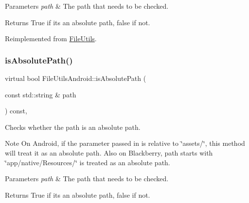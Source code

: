 \begin{DoxyParams}{Parameters}
{\em path} & The path that needs to be checked. \\
\hline
\end{DoxyParams}
\begin{DoxyReturn}{Returns}
True if it\textquotesingle{}s an absolute path, false if not. 
\end{DoxyReturn}


Reimplemented from \hyperlink{classFileUtils_aed08c5ac2854f3fb5c104386ab96a90c}{File\+Utils}.

\mbox{\label{classFileUtilsAndroid_ad13d954ba9ae2de51754965842134652}} 
\subsubsection{\texorpdfstring{is\+Absolute\+Path()}{isAbsolutePath()}\hspace{0.1cm}{\footnotesize\ttfamily [2/2]}}
{\footnotesize\ttfamily virtual bool File\+Utils\+Android\+::is\+Absolute\+Path (\begin{DoxyParamCaption}\item[{const std\+::string \&}]{path }\end{DoxyParamCaption}) const\hspace{0.3cm}{\ttfamily [override]}, {\ttfamily [virtual]}}

Checks whether the path is an absolute path.

\begin{DoxyNote}{Note}
On Android, if the parameter passed in is relative to \char`\"{}assets/\char`\"{}, this method will treat it as an absolute path. Also on Blackberry, path starts with \char`\"{}app/native/\+Resources/\char`\"{} is treated as an absolute path.
\end{DoxyNote}

\begin{DoxyParams}{Parameters}
{\em path} & The path that needs to be checked. \\
\hline
\end{DoxyParams}
\begin{DoxyReturn}{Returns}
True if it\textquotesingle{}s an absolute path, false if not. 
\end{DoxyReturn}


